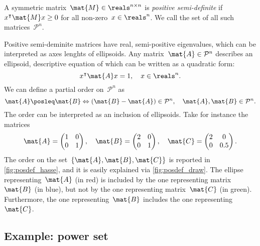 \begin{example}
    \begin{definition}
        A symmetric matrix~$\mat{M}\in \reals^{n\times n}$ is \emph{positive semi-definite} if~$x^\intercal \mat{M}x\geq 0$ for all non-zero~$x\in \reals^n$.
        We call the set of all such matrices~$\mathcal{P}^n$.
    \end{definition}
    Positive semi-deminite matrices have real, semi-positive eigenvalues, which can be interpreted as axes lenghts of ellipsoids.
    Any matrix~$\mat{A}\in \mathcal{P}^n$ describes an ellipsoid, descriptive equation of which can be written as a quadratic form:
    \begin{equation*}
        x^\intercal \mat{A}x=1,\quad x\in \reals^n.
    \end{equation*}
    We can define a partial order on~$\mathcal{P}^n$ as
    \begin{equation*}
        \mat{A}\posleq \mat{B} \Leftrightarrow (\mat{B}-\mat{A})\in \mathcal{P}^n, \quad \mat{A},\mat{B}\in \mathcal{P}^n.
    \end{equation*}
    The order can be interpreted as an inclusion of ellipsoids.
    Take for instance the matrices
    \begin{equation*}
        \mat{A}=\begin{pmatrix}
            1 & 0 \\0& 1
        \end{pmatrix}, \quad \mat{B}=\begin{pmatrix}
            2 & 0 \\0& 1
        \end{pmatrix},\quad \mat{C}=\begin{pmatrix}
            2 & 0 \\0& 0.5
        \end{pmatrix}.
    \end{equation*}
    The order on the set~$\{\mat{A},\mat{B},\mat{C}\}$ is reported in \cref{fig:posdef_hasse}, and it is easily explained via \cref{fig:posdef_draw}.
    The ellipse representing~$\mat{A}$ (in red) is included by the one representing matrix~$\mat{B}$ (in blue), but not by the one representing matrix~$\mat{C}$ (in green).
    Furthermore, the one representing~$\mat{B}$ includes the one representing~$\mat{C}$.
\end{example}

\subsection{Example: power set}


